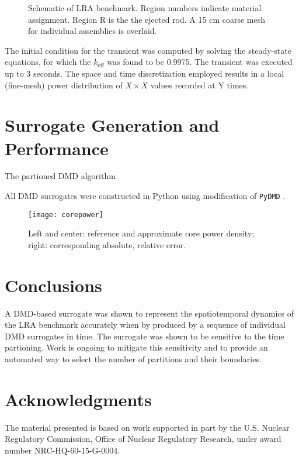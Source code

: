 \documentclass{anstrans}
\begin{document}
\begin{figure}
\caption{Schematic of LRA benchmark.  Region numbers indicate material assignment.  Region R is the the ejected rod.  A 15 cm coarse mesh for individual assemblies is overlaid.}
\label{fig:lra_core}
\end{figure}

The initial condition for the transient was computed by solving the steady-state equations, for which the $k_{\text{eff}}$ was found to be 0.9975.
The transient was executed up to 3 seconds.
The space and time discretization employed results in a local (fine-mesh) power distribution of $X \times X$ values recorded at Y times.


\section{Surrogate Generation and Performance}

The partioned DMD algorithm

All DMD surrogates were constructed in Python using modification of {\tt PyDMD} \cite{}.


\begin{figure*}[t!]
 \centering
 \texttt{[image: corepower]}\\
   \caption{Left and center: reference and approximate core power density; right: corresponding absolute, relative error.}
  \label{fig:corepower}
\end{figure*}


\section{Conclusions}

A DMD-based surrogate was shown to represent the spatiotemporal dynamics of the LRA benchmark accurately when by produced by a sequence of individual DMD surrogates in time. 
The surrogate was shown to be sensitive to the time partioning.
Work is ongoing to mitigate this sensitivity and to provide an automated way to select the number of partitions and their boundaries.

\section{Acknowledgments}

The material presented is based on work supported in part by the U.S. Nuclear Regulatory Commission, Office of Nuclear Regulatory Research, under award number NRC-HQ-60-15-G-0004.



\end{document}
